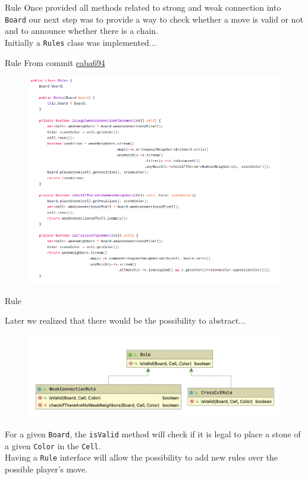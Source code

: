 \documentclass{beamer}
\begin{document}
\begin{frame}{Rule}
	Once provided all methods related to strong and weak connection into \texttt{Board} our next step was to provide a way to check whether a move is valid or not and to announce whether there is a chain.\\
	\vspace{0.7cm} 
	Initially a \texttt{Rules} class was implemented...
	
\end{frame}

\begin{frame}{Rule}
	\small From commit \href{https://github.com/lorenzobasile/konobi/blob/eaba694d6662a1b6803f7f22943636176281e572/src/main/java/konobi/Rules.java}{eaba694}
	\begin{figure}
		\includegraphics[scale=0.25]{images/rules-class.png}
	\end{figure}
\end{frame}

\begin{frame}{Rule}
	
	Later we realized that there would be the possibility to abstract...
	\begin{figure}
		\includegraphics[scale=0.4]{images/rules-uml.jpg}
	\end{figure}

	For a given \texttt{Board}, the \texttt{isValid} method will check if it is legal to place a stone of a given \texttt{Color} in the \texttt{Cell}. \\
	\vspace{0.1cm}
	Having a \texttt{Rule} interface will allow the possibility to add new rules over the possible player's move.
	
\end{frame}
\end{document}
